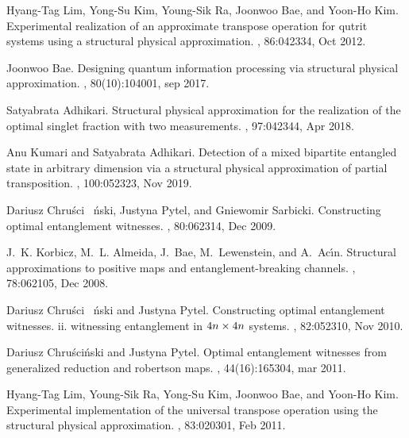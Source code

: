 \documentclass[12pt]{iopart}
\begin{document}
\begin{thebibliography}{10}
Hyang-Tag Lim, Yong-Su Kim, Young-Sik Ra, Joonwoo Bae, and Yoon-Ho Kim.
\newblock Experimental realization of an approximate transpose operation for
  qutrit systems using a structural physical approximation.
, 86:042334, Oct 2012.

Joonwoo Bae.
\newblock Designing quantum information processing via structural physical
  approximation.
, 80(10):104001, sep 2017.

Satyabrata Adhikari.
\newblock Structural physical approximation for the realization of the optimal
  singlet fraction with two measurements.
, 97:042344, Apr 2018.

Anu Kumari and Satyabrata Adhikari.
\newblock Detection of a mixed bipartite entangled state in arbitrary dimension
  via a structural physical approximation of partial transposition.
, 100:052323, Nov 2019.

Dariusz Chru\ifmmode {}\else \'{s}\fi{}ci\ifmmode~\else
  \'{n}\fi{}ski, Justyna Pytel, and Gniewomir Sarbicki.
\newblock Constructing optimal entanglement witnesses.
, 80:062314, Dec 2009.

J.~K. Korbicz, M.~L. Almeida, J.~Bae, M.~Lewenstein, and A.~Ac\'{\i}n.
\newblock Structural approximations to positive maps and entanglement-breaking
  channels.
, 78:062105, Dec 2008.

Dariusz Chru\ifmmode {}\else \'{s}\fi{}ci\ifmmode~\else
  \'{n}\fi{}ski and Justyna Pytel.
\newblock Constructing optimal entanglement witnesses. ii. witnessing
  entanglement in $4n\ifmmode\times\else\texttimes\fi{}4n$ systems.
, 82:052310, Nov 2010.

Dariusz Chru{\'{s}}ci{\'{n}}ski and Justyna Pytel.
\newblock Optimal entanglement witnesses from generalized reduction and
  robertson maps.
,
  44(16):165304, mar 2011.

Hyang-Tag Lim, Young-Sik Ra, Yong-Su Kim, Joonwoo Bae, and Yoon-Ho Kim.
\newblock Experimental implementation of the universal transpose operation
  using the structural physical approximation.
, 83:020301, Feb 2011.


\end{thebibliography}
\end{document}

